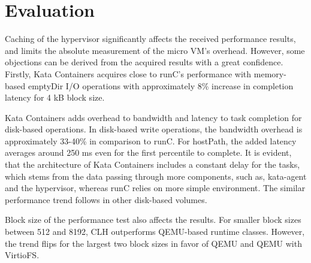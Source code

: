 \section{Evaluation}

Caching of the hypervisor significantly affects the received performance results, and limits the absolute measurement of the micro VM's overhead. However, some objections can be derived from the acquired results with a great confidence. Firstly, Kata Containers acquires close to runC's performance with memory-based emptyDir I/O operations with approximately 8\% increase in completion latency for 4 kB block size. 

Kata Containers adds overhead to bandwidth and latency to task completion for disk-based operations. In disk-based write operations, the bandwidth overhead is approximately 33-40\% in comparison to runC. For hostPath, the added latency averages around 250 ms even for the first percentile to complete. It is evident, that the architecture of Kata Containers includes a constant delay for the tasks, which stems from the data passing through more components, such as, kata-agent and the hypervisor, whereas runC relies on more simple environment. The similar performance trend follows in other disk-based volumes.

Block size of the performance test also affects the results. For smaller block sizes between 512 and 8192, CLH outperforms QEMU-based runtime classes. However, the trend flips for the largest two block sizes in favor of QEMU and QEMU with VirtioFS.